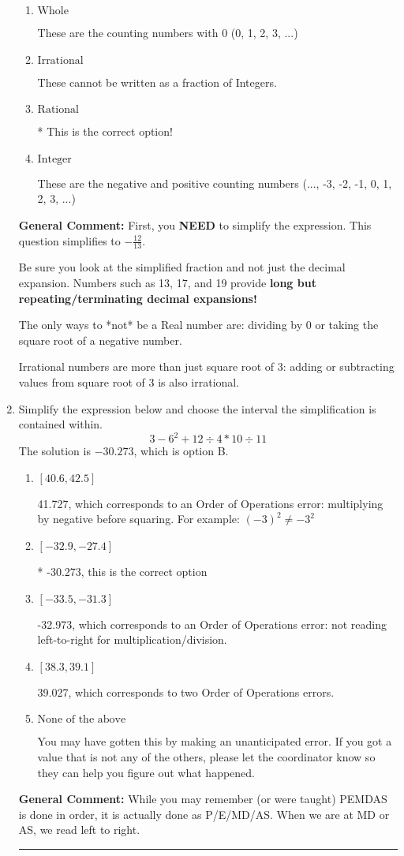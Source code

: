 \documentclass{extbook}[14pt]
\newcommand{\litem}[1]{\item #1

\rule{\textwidth}{0.4pt}}
\begin{document}
\begin{enumerate}
{\begin{enumerate}[label=\Alph*.]
These are Nonreal Complex numbers \textbf{OR} things that are not numbers (e.g., dividing by 0).
\item \( \text{Whole} \)

These are the counting numbers with 0 (0, 1, 2, 3, ...)
\item \( \text{Irrational} \)

These cannot be written as a fraction of Integers.
\item \( \text{Rational} \)

* This is the correct option!
\item \( \text{Integer} \)

These are the negative and positive counting numbers (..., -3, -2, -1, 0, 1, 2, 3, ...)
\end{enumerate}

\textbf{General Comment:} First, you \textbf{NEED} to simplify the expression. This question simplifies to $-\frac{12}{13}$. 
 
 Be sure you look at the simplified fraction and not just the decimal expansion. Numbers such as 13, 17, and 19 provide \textbf{long but repeating/terminating decimal expansions!} 
 
 The only ways to *not* be a Real number are: dividing by 0 or taking the square root of a negative number. 
 
 Irrational numbers are more than just square root of 3: adding or subtracting values from square root of 3 is also irrational.
}
\litem{
Simplify the expression below and choose the interval the simplification is contained within.
\[ 3 - 6^2 + 12 \div 4 * 10 \div 11 \]
The solution is \( -30.273 \), which is option B.\begin{enumerate}[label=\Alph*.]
\item \( [40.6, 42.5] \)

 41.727, which corresponds to an Order of Operations error: multiplying by negative before squaring. For example: $(-3)^2 \neq -3^2$
\item \( [-32.9, -27.4] \)

* -30.273, this is the correct option
\item \( [-33.5, -31.3] \)

 -32.973, which corresponds to an Order of Operations error: not reading left-to-right for multiplication/division.
\item \( [38.3, 39.1] \)

 39.027, which corresponds to two Order of Operations errors.
\item \( \text{None of the above} \)

 You may have gotten this by making an unanticipated error. If you got a value that is not any of the others, please let the coordinator know so they can help you figure out what happened.
\end{enumerate}

\textbf{General Comment:} While you may remember (or were taught) PEMDAS is done in order, it is actually done as P/E/MD/AS. When we are at MD or AS, we read left to right.
}
\end{enumerate}
\end{document}
